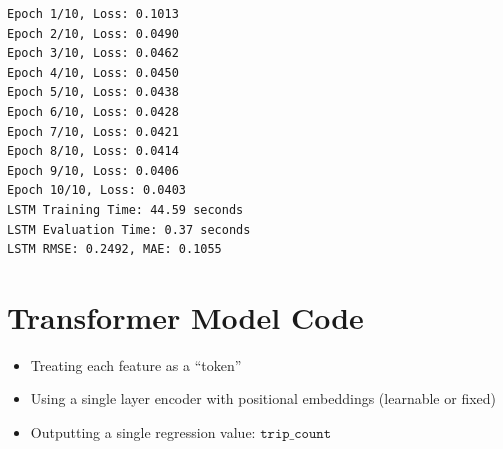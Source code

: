 \documentclass[11pt]{article}
\begin{document}
    \begin{Verbatim}[commandchars=\\\{\}]
Epoch 1/10, Loss: 0.1013
Epoch 2/10, Loss: 0.0490
Epoch 3/10, Loss: 0.0462
Epoch 4/10, Loss: 0.0450
Epoch 5/10, Loss: 0.0438
Epoch 6/10, Loss: 0.0428
Epoch 7/10, Loss: 0.0421
Epoch 8/10, Loss: 0.0414
Epoch 9/10, Loss: 0.0406
Epoch 10/10, Loss: 0.0403
LSTM Training Time: 44.59 seconds
LSTM Evaluation Time: 0.37 seconds
LSTM RMSE: 0.2492, MAE: 0.1055
    \end{Verbatim}

    \section{Transformer Model Code}\label{transformer-model-code}

\begin{itemize}
\item
  Treating each feature as a ``token''
\item
  Using a single layer encoder with positional embeddings (learnable or
  fixed)
\item
  Outputting a single regression value: \(\texttt{trip\_count}\)
\end{itemize}
\end{document}
